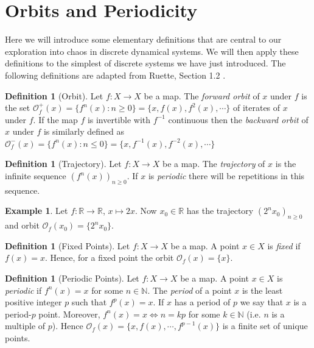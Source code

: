 \documentclass[11pt,a4paper,oneside]{memoir}
\theoremstyle{plain}
\theoremstyle{definition}
\newtheorem{defn}[thm]{Definition}
\newtheorem{exmp}[thm]{Example}
\begin{document}
\section{Orbits and Periodicity}
Here we will introduce some elementary definitions that are central to our exploration into chaos in discrete dynamical systems. We will then apply these definitions to the simplest of discrete systems we have just introduced. The following definitions are adapted from Ruette, Section 1.2 \cite{ruette}.

\begin{defn}[Orbit]
    Let $f: X \to X$ be a map. The \emph{forward orbit} of $x$ under $f$ is the set $\mathcal{O}^+_f(x) = \lbrace f^n(x) : n \geq 0 \rbrace = \lbrace x, f(x), f^2(x), \cdots \rbrace$ of iterates of $x$ under $f$. If the map $f$ is invertible with $f^{-1}$ continuous then the \emph{backward orbit} of $x$ under $f$ is similarly defined as $\mathcal{O}^-_f(x) = \lbrace f^n(x) : n \leq 0 \rbrace = \lbrace x, f^{-1}(x), f^{-2}(x), \cdots \rbrace$
\end{defn}

\begin{defn}[Trajectory]
    Let $f: X \to X$ be a map. The \emph{trajectory} of $x$ is the infinite sequence $(f^n(x))_{n \geq 0}$. If $x$ is \emph{periodic} there will be repetitions in this sequence.
\end{defn}

\begin{exmp}
    Let $f: \mathbb{R} \to \mathbb{R}$, $x \mapsto 2x$. Now $x_0 \in \mathbb{R}$ has the trajectory $(2^nx_0)_{n\geq 0}$ and orbit $\mathcal{O}_f(x_0) = \lbrace 2^nx_0 \rbrace$.
\end{exmp}

\begin{defn}[Fixed Points]
    Let $f: X \to X$ be a map. A point $x \in X$ is \emph{fixed} if $f(x) = x$. Hence, for a fixed point the orbit $\mathcal{O}_f(x) = \lbrace x \rbrace$.
\end{defn}

\begin{defn}[Periodic Points]
    Let $f: X \to X$ be a map. A point $x \in X$ is \emph{periodic} if $f^n(x) = x$ for some $n \in \mathbb{N}$. The \emph{period} of a point $x$ is the least positive integer $p$ such that $f^p(x) = x$. If $x$ has a period of $p$ we say that $x$ is a period-$p$ point. Moreover, $f^n(x) = x \iff n = kp$ for some $k \in \mathbb{N}$ (i.e. $n$ is a multiple of $p$). Hence $\mathcal{O}_f(x) = \lbrace x, f(x), \cdots, f^{p-1}(x) \rbrace$ is a finite set of unique points.

\end{defn}
\end{document}
